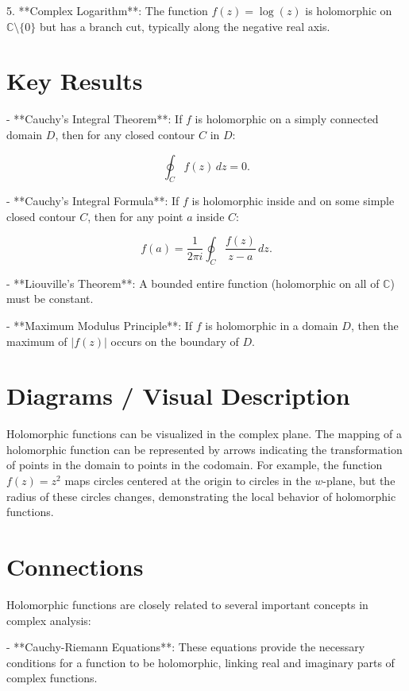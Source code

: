 \documentclass[11pt,a4paper]{article}
\begin{document}
5. **Complex Logarithm**: The function \( f(z) = \log(z) \) is holomorphic on \( \mathbb{C} \setminus \{0\} \) but has a branch cut, typically along the negative real axis.

\section{Key Results}
- **Cauchy's Integral Theorem**: If \( f \) is holomorphic on a simply connected domain \( D \), then for any closed contour \( C \) in \( D \):

\begin{equation}
\oint_C f(z) \, dz = 0.
\end{equation}

- **Cauchy's Integral Formula**: If \( f \) is holomorphic inside and on some simple closed contour \( C \), then for any point \( a \) inside \( C \):

\begin{equation}
f(a) = \frac{1}{2\pi i} \oint_C \frac{f(z)}{z - a} \, dz.
\end{equation}

- **Liouville's Theorem**: A bounded entire function (holomorphic on all of \( \mathbb{C} \)) must be constant.

- **Maximum Modulus Principle**: If \( f \) is holomorphic in a domain \( D \), then the maximum of \( |f(z)| \) occurs on the boundary of \( D \).

\section{Diagrams / Visual Description}
Holomorphic functions can be visualized in the complex plane. The mapping of a holomorphic function can be represented by arrows indicating the transformation of points in the domain to points in the codomain. For example, the function \( f(z) = z^2 \) maps circles centered at the origin to circles in the \( w \)-plane, but the radius of these circles changes, demonstrating the local behavior of holomorphic functions.

\section{Connections}
Holomorphic functions are closely related to several important concepts in complex analysis:

- **Cauchy-Riemann Equations**: These equations provide the necessary conditions for a function to be holomorphic, linking real and imaginary parts of complex functions.
\end{document}
